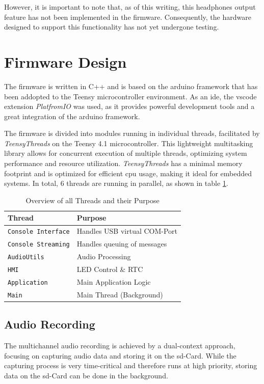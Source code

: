 However, it is important to note that, as of this writing, this headphones output feature has not been implemented in the firmware.
Consequently, the hardware designed to support this functionality has not yet undergone testing.


\newpage
\section{Firmware Design} \label{sec:acquisition_system_firmware_design}
The firmware is written in C++ and is based on the \gls{arduino} framework that has been addopted to the Teensy microcontroller environment.
As an \acrshort{ide}, the \acrshort{vscode} extension \textit{PlatfromIO} was used, as it provides powerful development tools and a great integration of the \gls{arduino} framework.

The firmware is divided into modules running in individual threads, facilitated by \textit{TeensyThreads} on the Teensy 4.1 microcontroller.
This lightweight multitasking library allows for concurrent execution of multiple threads, optimizing system performance and resource utilization.
\textit{TeensyThreads} has a minimal memory footprint and is optimized for efficient \acrshort{cpu} usage, making it ideal for embedded systems.
In total, 6 threads are running in parallel, as shown in table \ref{tab:acquisition_system_threads}.
\begin{table}[h]
	\centering
	\begin{tabular}{|l|l|}
		\hline
		Thread                     & Purpose                      \\ \hline
		\texttt{Console Interface} & Handles USB virtual COM-Port \\ \hline
		\texttt{Console Streaming} & Handles queuing of messages  \\ \hline
		\texttt{AudioUtils}        & Audio Processing             \\ \hline
		\texttt{HMI}               & LED Control \& RTC           \\ \hline
		\texttt{Application}       & Main Application Logic       \\ \hline
		\texttt{Main}              & Main Thread (Background)     \\ \hline
	\end{tabular}
	\caption{Overview of all Threads and their Purpose}
	\label{tab:acquisition_system_threads}
\end{table}

\subsection{Audio Recording}
The multichannel audio recording is achieved by a dual-context approach, focusing on capturing audio data and storing it on the \acrshort{sd}-Card.
While the capturing process is very time-critical and therefore runs at high priority, storing data on the \acrshort{sd}-Card can be done in the background.

